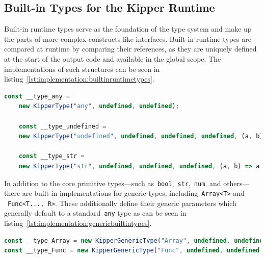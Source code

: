 \subsection{Built-in Types for the Kipper Runtime}
\label{subsec:builtintypes}

Built-in runtime types serve as the foundation of the type system and make up the parts of more complex constructs like interfaces. Built-in runtime types are compared at runtime by comparing their references, as they are uniquely defined at the start of the output code and available in the global scope. The implementations of such structures can be seen in listing~\ref{lst:implementation:builtinruntimetypes}.

\begin{lstlisting}[language=TypeScript,caption=Examples for the built-in runtime types,label=lst:implementation:builtinruntimetypes]
	const __type_any =
	new KipperType("any", undefined, undefined);

	const __type_undefined =
	new KipperType("undefined", undefined, undefined, undefined, (a, b) => a.name === b.name);

	const __type_str =
	new KipperType("str", undefined, undefined, undefined, (a, b) => a.name === b.name);
\end{lstlisting}

In addition to the core primitive types—such as~\lstinline|bool|,~\lstinline|str|,~\lstinline|num|, and others—there are built-in implementations for generic types, including~\lstinline|Array<T>| and ~\lstinline|Func<T..., R>|. These additionally define their generic parameters which generally default to a standard~\lstinline|any| type as can be seen in listing~\ref{lst:implementation:genericbuiltintypes}.

\begin{lstlisting}[language=Typescript,caption=Generic built-in types,label=lst:implementation:genericbuiltintypes]
const __type_Array = new KipperGenericType("Array", undefined, undefined, {T: __type_any});
const __type_Func = new KipperGenericType("Func", undefined, undefined, {T: [], R: __type_any});
\end{lstlisting}

